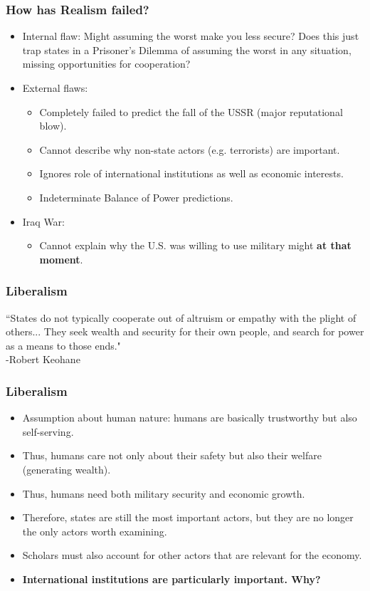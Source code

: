 \documentclass{beamer}
\begin{document}
\begin{frame} 
\frametitle{\LARGE{How has Realism failed?}}
\begin{itemize}
    \item Internal flaw: Might assuming the worst make you less secure? Does this just trap states in a Prisoner's Dilemma of assuming the worst in any situation, missing opportunities for cooperation? \pause
    \item External flaws: \pause
    \begin{itemize}
        \item Completely failed to predict the fall of the USSR (major reputational blow). \pause
        \item Cannot describe why non-state actors (e.g. terrorists) are important. \pause
        \item Ignores role of international institutions as well as economic interests. \pause
        \item Indeterminate Balance of Power predictions.
    \end{itemize}
    \item Iraq War: \pause 
    \begin{itemize}
        \item Cannot explain why the U.S. was willing to use military might \textbf{at that moment}. 
    \end{itemize}
\end{itemize}
\end{frame}


\begin{frame} 
\frametitle{\LARGE{Liberalism}}
``States do not typically cooperate out of altruism or empathy with the plight of others... They seek wealth and security for their own people, and search for power as a means to those ends." \\
\hspace*{160pt} -Robert Keohane
\end{frame}


\begin{frame} 
\frametitle{\LARGE{Liberalism}}
\begin{itemize}
    \item Assumption about human nature: \pause humans are basically trustworthy but also self-serving. \pause 
    \item Thus, humans care not only about their safety but also their welfare (generating wealth). \pause
    \item Thus, humans need both military security and economic growth. \pause
    \item Therefore, states are still the most important actors, but they are no longer the only actors worth examining.
    \item Scholars must also account for other actors that are relevant for the economy. \pause
    \item \textbf{International institutions are particularly important. Why?}
\end{itemize}
\end{frame}
\end{document}
